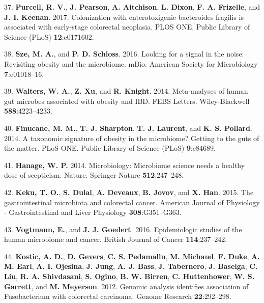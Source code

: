 \documentclass[12pt,]{article}
\begin{document}
\hypertarget{ref-Purcell2017}{}
37. \textbf{Purcell, R. V.}, \textbf{J. Pearson}, \textbf{A. Aitchison},
\textbf{L. Dixon}, \textbf{F. A. Frizelle}, and \textbf{J. I. Keenan}.
2017. Colonization with enterotoxigenic bacteroides fragilis is
associated with early-stage colorectal neoplasia. PLOS ONE. Public
Library of Science (PLoS) \textbf{12}:e0171602.

\hypertarget{ref-Sze2016}{}
38. \textbf{Sze, M. A.}, and \textbf{P. D. Schloss}. 2016. Looking for a
signal in the noise: Revisiting obesity and the microbiome. mBio.
American Society for Microbiology \textbf{7}:e01018--16.

\hypertarget{ref-Walters2014}{}
39. \textbf{Walters, W. A.}, \textbf{Z. Xu}, and \textbf{R. Knight}.
2014. Meta-analyses of human gut microbes associated with obesity and
IBD. FEBS Letters. Wiley-Blackwell \textbf{588}:4223--4233.

\hypertarget{ref-Finucane2014}{}
40. \textbf{Finucane, M. M.}, \textbf{T. J. Sharpton}, \textbf{T. J.
Laurent}, and \textbf{K. S. Pollard}. 2014. A taxonomic signature of
obesity in the microbiome? Getting to the guts of the matter. PLoS ONE.
Public Library of Science (PLoS) \textbf{9}:e84689.

\hypertarget{ref-Hanage2014}{}
41. \textbf{Hanage, W. P.} 2014. Microbiology: Microbiome science needs
a healthy dose of scepticism. Nature. Springer Nature
\textbf{512}:247--248.

\hypertarget{ref-keku_gastrointestinal_2015}{}
42. \textbf{Keku, T. O.}, \textbf{S. Dulal}, \textbf{A. Deveaux},
\textbf{B. Jovov}, and \textbf{X. Han}. 2015. The gastrointestinal
microbiota and colorectal cancer. American Journal of Physiology -
Gastrointestinal and Liver Physiology \textbf{308}:G351--G363.

\hypertarget{ref-vogtmann_epidemiologic_2016}{}
43. \textbf{Vogtmann, E.}, and \textbf{J. J. Goedert}. 2016.
Epidemiologic studies of the human microbiome and cancer. British
Journal of Cancer \textbf{114}:237--242.

\hypertarget{ref-kostic_genomic_2012}{}
44. \textbf{Kostic, A. D.}, \textbf{D. Gevers}, \textbf{C. S.
Pedamallu}, \textbf{M. Michaud}, \textbf{F. Duke}, \textbf{A. M. Earl},
\textbf{A. I. Ojesina}, \textbf{J. Jung}, \textbf{A. J. Bass},
\textbf{J. Tabernero}, \textbf{J. Baselga}, \textbf{C. Liu}, \textbf{R.
A. Shivdasani}, \textbf{S. Ogino}, \textbf{B. W. Birren}, \textbf{C.
Huttenhower}, \textbf{W. S. Garrett}, and \textbf{M. Meyerson}. 2012.
Genomic analysis identifies association of Fusobacterium with colorectal
carcinoma. Genome Research \textbf{22}:292--298.
\end{document}
